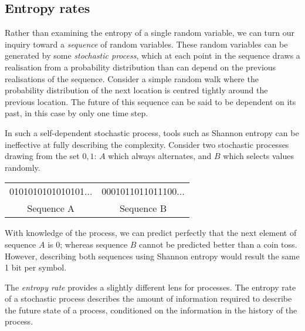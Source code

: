 

\subsection{Entropy rates}\label{sec:entropyrate}

Rather than examining the entropy of a single random variable, we can turn our inquiry toward a \emph{sequence} of random variables. These random variables can be generated by some \emph{stochastic process}, which at each point in the sequence draws a realisation from a probability distribution than can depend on the previous realisations of the sequence. Consider a simple random walk where the probability distribution of the next location is centred tightly around the previous location. The future of this sequence can be said to be dependent on its past, in this case by only one time step.

In such a self-dependent stochastic process, tools such as Shannon entropy can be ineffective at fully describing the complexity. Consider two stochastic processes drawing from the set ${0,1}$: $A$ which always alternates, and $B$ which selects values randomly.

\begin{center}
\begin{tabular}{cc}
0101010101010101...  &  0001011011011100... \\ 
Sequence A & Sequence B \\
\end{tabular}
\end{center}

With knowledge of the process, we can predict perfectly that the next element of sequence $A$ is 0; whereas sequence $B$ cannot be predicted better than a coin toss. However, describing both sequences using Shannon entropy would result the same 1 bit per symbol.

The \emph{entropy rate} provides a slightly different lens for processes. The entropy rate of a stochastic process describes the amount of information required to describe the future state of a process, conditioned on the information in the history of the process.

